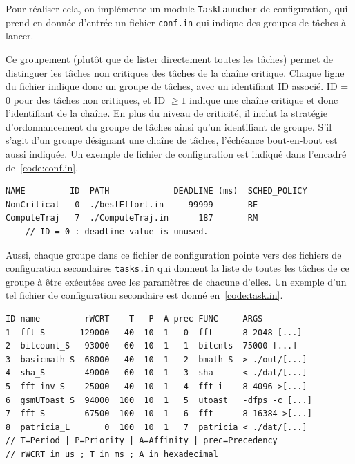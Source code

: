 \documentclass[french, a4paper, 11pt, twoside, pdftex]{StyleThese}
\begin{document}
	Pour réaliser cela, on implémente un module \texttt{TaskLauncher} de configuration, qui prend en donnée d'entrée un fichier \texttt{conf.in} qui indique des groupes de tâches à lancer. 
	
	Ce groupement (plutôt que de lister directement toutes les tâches) permet de distinguer les tâches non critiques des tâches de la chaîne critique. Chaque ligne du fichier indique donc un groupe de tâches, avec un identifiant ID associé. ID = 0 pour des tâches non critiques, et ID $ \geq1 $ indique une chaîne critique et donc l'identifiant de la chaîne.
	En plus du niveau de criticité, il inclut la stratégie d'ordonnancement du groupe de tâches ainsi qu'un identifiant de groupe. S'il s'agit d'un groupe désignant une chaîne de tâches, l'échéance bout-en-bout est aussi indiquée. Un exemple de fichier de configuration est indiqué dans l'encadré de~\autoref{code:conf.in}.
	
\begin{lstlisting}[caption={Exemple type de fichier d'entrée conf.in}, label={code:conf.in}]
NAME         ID  PATH             DEADLINE (ms)  SCHED_POLICY
NonCritical   0  ./bestEffort.in     99999       BE
ComputeTraj   7  ./ComputeTraj.in      187       RM
	// ID = 0 : deadline value is unused.
\end{lstlisting}

	Aussi, chaque groupe dans ce fichier de configuration pointe vers des fichiers de configuration secondaires \texttt{tasks.in} qui donnent la liste de toutes les tâches de ce groupe à être exécutées avec les paramètres de chacune d'elles. Un exemple d'un tel fichier de configuration secondaire est donné en~\autoref{code:task.in}.
	\pagebreak
	\begin{lstlisting}[caption={Fichier d'entrée pour une chaine de tâche}, label={code:task.in}]
ID name         rWCRT    T   P  A prec FUNC     ARGS
1  fft_S       129000   40  10  1   0  fft      8 2048 [...]
2  bitcount_S   93000   60  10  1   1  bitcnts  75000 [...]
3  basicmath_S  68000   40  10  1   2  bmath_S  > ./out/[...]
4  sha_S        49000   60  10  1   3  sha      < ./dat/[...]
5  fft_inv_S    25000   40  10  1   4  fft_i    8 4096 >[...]
6  gsmUToast_S  94000  100  10  1   5  utoast   -dfps -c [...]
7  fft_S        67500  100  10  1   6  fft      8 16384 >[...]
8  patricia_L       0  100  10  1   7  patricia < ./dat/[...]
// T=Period | P=Priority | A=Affinity | prec=Precedency
// rWCRT in us ; T in ms ; A in hexadecimal
\end{lstlisting} %
	
\end{document}
